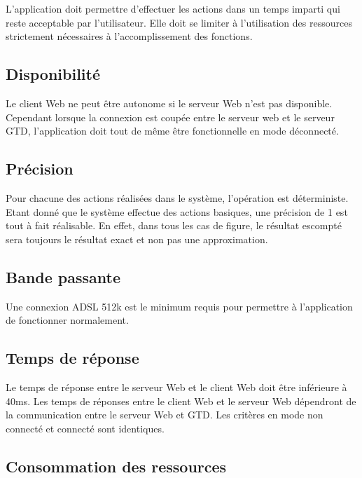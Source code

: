 	L'application doit permettre d'effectuer les actions dans un temps imparti qui reste acceptable par l'utilisateur. Elle doit se limiter à l'utilisation des ressources strictement nécessaires à l'accomplissement des fonctions.


	\subsection{Disponibilité}

	Le client Web ne peut être autonome si le serveur Web n'est pas disponible. Cependant lorsque la connexion est coupée entre le serveur web et le serveur GTD, l'application doit tout de même être fonctionnelle en mode déconnecté. 		


	\subsection{Précision}
	
	Pour chacune des actions réalisées dans le système, l'opération est déterministe. Etant donné que le système effectue des actions basiques, une précision de 1 est tout à fait réalisable. En effet, dans tous les cas de figure, le résultat escompté sera toujours le résultat exact et non pas une approximation.


	\subsection{Bande passante}

	Une connexion ADSL 512k est le minimum requis pour permettre à l'application de fonctionner normalement.

	\subsection{Temps de réponse}

	Le temps de réponse entre le serveur Web et le client Web doit être inférieure à 40ms. Les temps de réponses entre le client Web et le serveur Web dépendront de la communication entre le serveur Web et GTD. Les critères en mode non connecté et connecté sont identiques.


	


	\subsection{Consommation des ressources}

